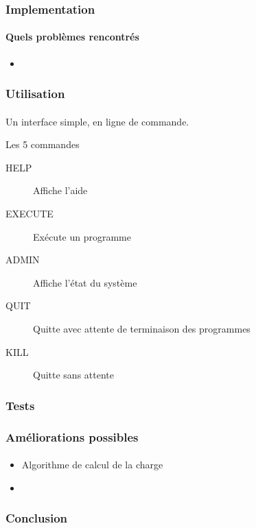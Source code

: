 \documentclass{beamer}
\begin{document}
  \begin{frame}
    \frametitle{Implementation}
    \framesubtitle{Quels problèmes rencontrés}
      \begin{itemize}
        \item 
      \end{itemize}
  \end{frame}
  
  \begin{frame}
    \frametitle{Utilisation}
    \framesubtitle{}
      
      Un interface simple, en ligne de commande. 
      \begin{block}{Les 5 commandes}
      \begin{description}
        \item[HELP] Affiche l'aide
        \item[EXECUTE] Exécute un programme
        \item[ADMIN] Affiche l'état du système 
        \item[QUIT] Quitte avec attente de terminaison des programmes 
        \item[KILL] Quitte sans attente
      \end{description}
      \end{block}
  \end{frame}
  
  \begin{frame}
    \frametitle{Tests}
    \framesubtitle{}
  \end{frame}
  
  \begin{frame}
    \frametitle{Améliorations possibles}
    \framesubtitle{}
    \begin{itemize}
       \item Algorithme de calcul de la charge
       \item 
    \end{itemize}
  \end{frame}
  
  \begin{frame}
    \frametitle{Conclusion}
    \framesubtitle{}
  \end{frame}
\end{document}
